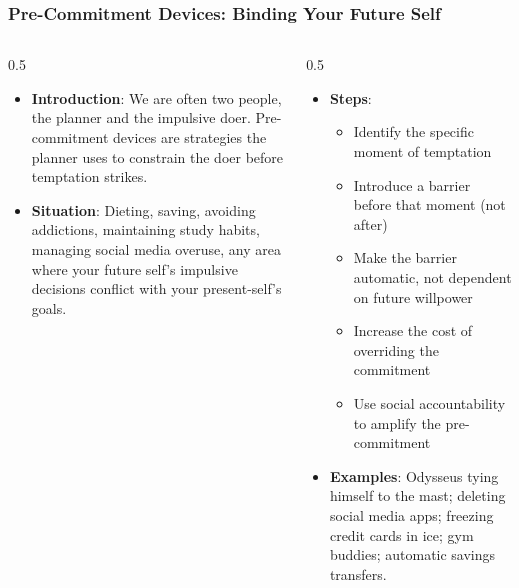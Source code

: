 \begin{frame}[fragile]\frametitle{Pre-Commitment Devices: Binding Your Future Self}
\begin{columns}
    \begin{column}[T]{0.5\linewidth}
      \begin{itemize}
        \item \textbf{Introduction}: We are often two people, the planner and the impulsive doer. Pre-commitment devices are strategies the planner uses to constrain the doer before temptation strikes.
        \item \textbf{Situation}: Dieting, saving, avoiding addictions, maintaining study habits, managing social media overuse, any area where your future self's impulsive decisions conflict with your present-self's goals.
      \end{itemize}
    \end{column}
    \begin{column}[T]{0.5\linewidth}
      \begin{itemize}
        \item \textbf{Steps}:
        \begin{itemize}
          \item Identify the specific moment of temptation
          \item Introduce a barrier before that moment (not after)
          \item Make the barrier automatic, not dependent on future willpower
          \item Increase the cost of overriding the commitment
          \item Use social accountability to amplify the pre-commitment
        \end{itemize}\item \textbf{Examples}: Odysseus tying himself to the mast; deleting social media apps; freezing credit cards in ice; gym buddies; automatic savings transfers.
      \end{itemize}
    \end{column}
  \end{columns}
\end{frame}

